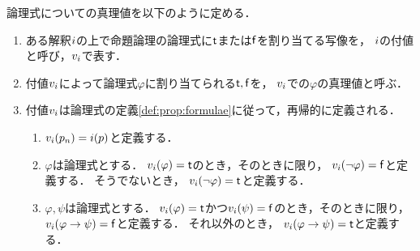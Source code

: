 \begin{myDefinition}[付値関数]
  \label{def:prop:valuation}
  論理式についての真理値を以下のように定める．
  \begin{enumerate}
    \item ある解釈$i$の上で命題論理の論理式に$\mathsf{t}$または$\mathsf{f}$を割り当てる写像を，
          $i$の付値と呼び，$v_i$で表す．
    \item 付値$v_i$によって論理式$\varphi$に割り当てられる$\mathsf{t},\mathsf{f}$を，
          $v_i$での$\varphi$の真理値と呼ぶ．
    \item 付値$v_i$は論理式の定義\ref*{def:prop:formulae}に従って，再帰的に定義される．
          \begin{enumerate}
            \item $v_i(p_n) = i(p)$と定義する．
            \item $\varphi$は論理式とする．
                  $v_i(\varphi) = \mathsf{t}$のとき，そのときに限り，
                  $v_i(\neg \varphi) = \mathsf{f}$と定義する．
                  そうでないとき，
                  $v_i(\neg \varphi) = \mathsf{t}$と定義する．
            \item $\varphi,\psi$は論理式とする．
                  $v_i(\varphi) = \mathsf{t}$かつ$v_i(\psi) = \mathsf{f}$のとき，そのときに限り，
                  $v_i(\varphi \to \psi) = \mathsf{f}$と定義する．
                  それ以外のとき，
                  $v_i(\varphi \to \psi) = \mathsf{t}$と定義する．
          \end{enumerate}
  \end{enumerate}
\end{myDefinition}

